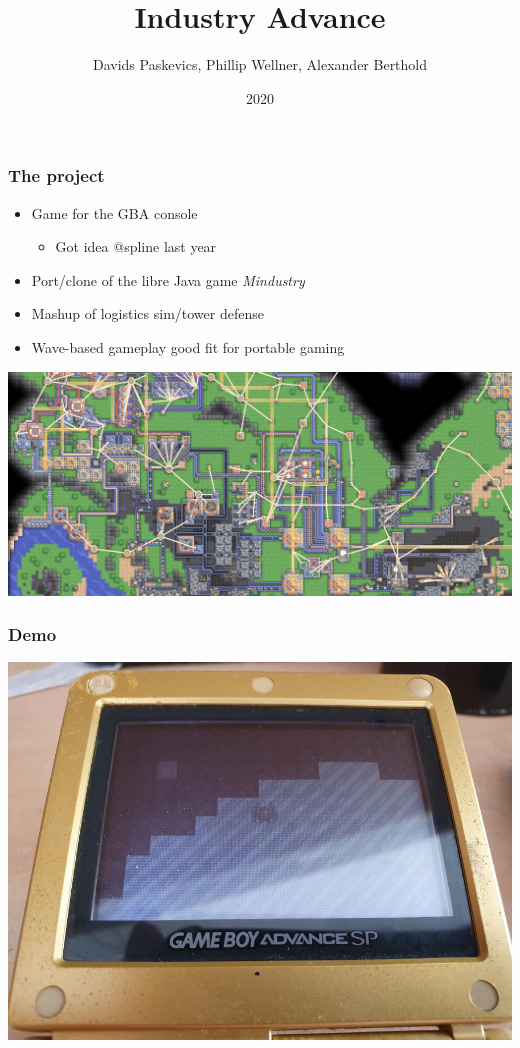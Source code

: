 \documentclass{beamer}
\title{Industry Advance}
\author{Davids Paskevics, Phillip Wellner, Alexander Berthold}
\institute{FU Berlin}
\date{2020}
\begin{document}
\frame{\titlepage}

\begin{frame}
	\frametitle{The project}
	\begin{itemize}
		\item Game for the GBA console \begin{itemize}
			      \item Got idea @spline last year
		      \end{itemize}
		\item Port/clone of the libre Java game \emph{Mindustry}
		\item Mashup of logistics sim/tower defense
		\item Wave-based gameplay good fit for portable gaming
	\end{itemize}
\end{frame}

\begin{frame}
	\includegraphics[scale=0.4]{images/mindustry.png}
\end{frame}

\begin{frame}
	\frametitle{Demo}
	\includegraphics[scale=0.3]{images/demo_gba.jpg}
\end{frame}
\end{document}
